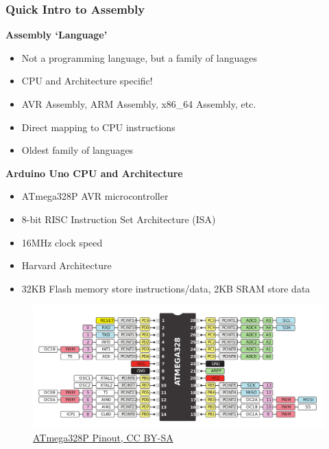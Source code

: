 \documentclass{beamer} \usetheme{Madrid}
\begin{document}
\begin{frame}
    \frametitle{Quick Intro to Assembly}
    \vfill
    \textbf{Assembly `Language'}
    \begin{itemize}
        \item Not a programming language, but a family of languages
        \item CPU and Architecture specific!
        \item AVR Assembly, ARM Assembly, x86\_64 Assembly, etc.
        \item Direct mapping to CPU instructions
        \item Oldest family of languages
    \end{itemize}
    \vfill
    \textbf{Arduino Uno CPU and Architecture}
    \begin{itemize}
        \item ATmega328P AVR microcontroller
        \item 8-bit RISC Instruction Set Architecture (ISA)
        \item 16MHz clock speed
        \item Harvard Architecture
        \item 32KB Flash memory store instructions/data, 2KB SRAM store data
    \end{itemize}
    \vfill
\end{frame}

\begin{frame}
    \vfill
    \begin{center} \begin{figure}
        \includegraphics[width=\textwidth]{atmega_pinout.png}
        \caption{\href{https://commons.wikimedia.org/wiki/File:Pinout_of_ARDUINO_Board_and_ATMega328PU.svg}{ATmega328P Pinout, CC BY-SA}}
    \end{figure} \end{center}
    \vfill
\end{frame}
\end{document}
